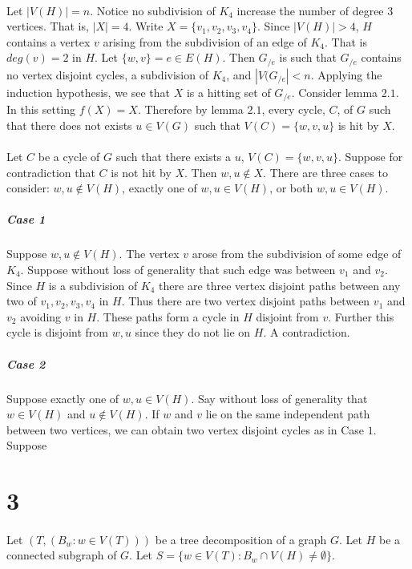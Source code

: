\documentclass[letterpaper,12pt,oneside,onecolumn]{report}
\begin{document}
\paragraph{}
Let $|V(H)| = n$. Notice no subdivision of $K_4$ increase the number of degree $3$ vertices. That is, $|X| = 4$. Write $X = \{v_1, v_2, v_3, v_4\}$. Since $|V(H)| > 4$, $H$ contains a vertex $v$ arising from the subdivision of an edge of $K_4$. That is $deg(v) = 2$ in $H$. Let $\{w,v\} = e \in E(H)$. Then $G_{/e}$ is such that $G_{/e}$ contains no vertex disjoint cycles, a subdivision of $K_4$, and $|V(G_{/e}| < n$. Applying the induction hypothesis, we see that $X$ is a hitting set of $G_{/e}$. Consider lemma $2.1$. In this setting $f(X) = X$. Therefore by lemma $2.1$, every cycle, $C$, of $G$ such that there does not exists $u \in V(G)$ such that $V(C) = \{w,v,u\}$ is hit by $X$.
\paragraph{}
Let $C$ be a cycle of $G$ such that there exists a $u$, $V(C) = \{w,v,u\}$. Suppose for contradiction that $C$ is not hit by $X$. Then $w, u \not\in X$. There are three cases to consider: $w, u \not \in V(H)$, exactly one of $w,u \in V(H)$, or both $w,u \in V(H)$.
\subparagraph{Case 1} Suppose $w,u \not\in V(H)$. The vertex $v$ arose from the subdivision of some edge of $K_4$. Suppose without loss of generality that such edge was between $v_1$ and $v_2$. Since $H$ is a subdivision of $K_4$ there are three vertex disjoint paths between any two of $v_1,v_2,v_3,v_4$ in $H$. Thus there are two vertex disjoint paths between $v_1$ and $v_2$ avoiding $v$ in $H$. These paths form a cycle in $H$ disjoint from $v$. Further this cycle is disjoint from $w,u$ since they do not lie on $H$. A contradiction.
\subparagraph{Case 2}
Suppose exactly one of $w,u \in V(H)$. Say without loss of generality that $w \in V(H)$ and $u \not \in V(H)$. If $w$ and $v$ lie on the same independent path between two vertices, we can obtain two vertex disjoint cycles as in Case $1$. Suppose  
\section*{3}
\paragraph{}
Let $(T,(B_w : w\in V(T)))$ be a tree decomposition of a graph $G$. Let $H$ be a connected subgraph of $G$. Let $S = \{w \in V(T) : B_w \cap V(H) \neq \emptyset \}$.
\end{document}

